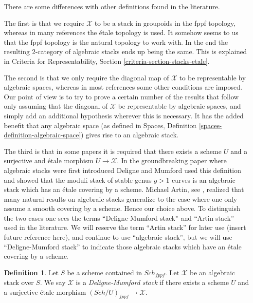 \documentclass{stacks-project}
\theoremstyle{plain}
\theoremstyle{definition}
\newtheorem{definition}[subsection]{Definition}
\theoremstyle{remark}
\numberwithin{equation}{subsection}
\def\Sch{\mathit{Sch}}
\begin{document}
\noindent
There are some differences with other definitions found in the literature.

\medskip\noindent
The first is that we require $\mathcal{X}$ to be a stack in groupoids
in the fppf topology, whereas in many references the \'etale topology is
used. It somehow seems to us that the fppf topology is the natural topology
to work with. In the end the resulting $2$-category of algebraic stacks
ends up being the same. This is explained in
Criteria for Representability, Section \ref{criteria-section-stacks-etale}.

\medskip\noindent
The second is that we only require the diagonal map of $\mathcal{X}$ to be
representable by algebraic spaces, whereas in most references some other
conditions are imposed. Our point of view is to try to prove a certain
number of the results that follow only assuming that the diagonal
of $\mathcal{X}$ be representable by algebraic spaces, and simply add
an additional hypothesis wherever this is necessary. It has the added
benefit that any algebraic space (as defined in
Spaces, Definition \ref{spaces-definition-algebraic-space})
gives rise to an algebraic stack.

\medskip\noindent
The third is that in some papers it is required that there exists a
scheme $U$ and a surjective and \'etale morphism $U \to \mathcal{X}$.
In the groundbreaking paper \cite{DM} where algebraic stacks were first
introduced Deligne and Mumford used this definition and showed that
the moduli stack of stable genus $g > 1$ curves is an algebraic stack
which has an \'etale covering by a scheme. Michael Artin, see
\cite{ArtinVersal}, realized that many
natural results on algebraic stacks generalize to the case where one
only assume a smooth covering by a scheme. Hence our choice above.
To distinguish the two cases one sees the terms ``Deligne-Mumford stack''
and ``Artin stack'' used in the literature. We will reserve the term
``Artin stack'' for later use (insert future reference here), and continue
to use ``algebraic stack'', but we will use ``Deligne-Mumford stack''
to indicate those algebraic stacks which have an \'etale covering by a
scheme.

\begin{definition}
\label{definition-deligne-mumford}
Let $S$ be a scheme contained in $\Sch_{fppf}$.
Let $\mathcal{X}$ be an algebraic stack over $S$.
We say $\mathcal{X}$ is a {\it Deligne-Mumford stack} if there exists
a scheme $U$ and a surjective \'etale morphism
$(\Sch/U)_{fppf} \to \mathcal{X}$.
\end{definition}
\end{document}
